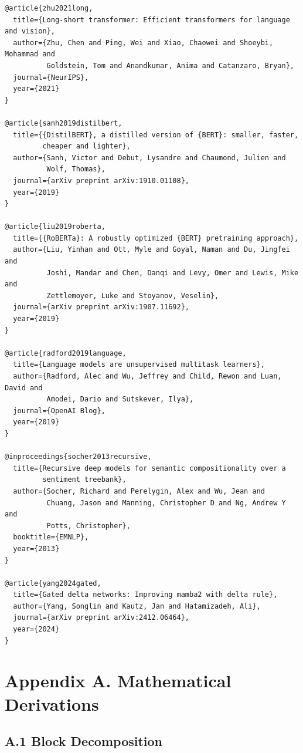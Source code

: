 \begin{lstlisting}
@article{zhu2021long,
  title={Long-short transformer: Efficient transformers for language and vision},
  author={Zhu, Chen and Ping, Wei and Xiao, Chaowei and Shoeybi, Mohammad and 
          Goldstein, Tom and Anandkumar, Anima and Catanzaro, Bryan},
  journal={NeurIPS},
  year={2021}
}

@article{sanh2019distilbert,
  title={{DistilBERT}, a distilled version of {BERT}: smaller, faster, 
         cheaper and lighter},
  author={Sanh, Victor and Debut, Lysandre and Chaumond, Julien and 
          Wolf, Thomas},
  journal={arXiv preprint arXiv:1910.01108},
  year={2019}
}

@article{liu2019roberta,
  title={{RoBERTa}: A robustly optimized {BERT} pretraining approach},
  author={Liu, Yinhan and Ott, Myle and Goyal, Naman and Du, Jingfei and 
          Joshi, Mandar and Chen, Danqi and Levy, Omer and Lewis, Mike and 
          Zettlemoyer, Luke and Stoyanov, Veselin},
  journal={arXiv preprint arXiv:1907.11692},
  year={2019}
}

@article{radford2019language,
  title={Language models are unsupervised multitask learners},
  author={Radford, Alec and Wu, Jeffrey and Child, Rewon and Luan, David and 
          Amodei, Dario and Sutskever, Ilya},
  journal={OpenAI Blog},
  year={2019}
}

@inproceedings{socher2013recursive,
  title={Recursive deep models for semantic compositionality over a 
         sentiment treebank},
  author={Socher, Richard and Perelygin, Alex and Wu, Jean and 
          Chuang, Jason and Manning, Christopher D and Ng, Andrew Y and 
          Potts, Christopher},
  booktitle={EMNLP},
  year={2013}
}

@article{yang2024gated,
  title={Gated delta networks: Improving mamba2 with delta rule},
  author={Yang, Songlin and Kautz, Jan and Hatamizadeh, Ali},
  journal={arXiv preprint arXiv:2412.06464},
  year={2024}
}
\end{lstlisting}




\section{Appendix A. Mathematical Derivations}

\subsection{A.1 Block Decomposition}

